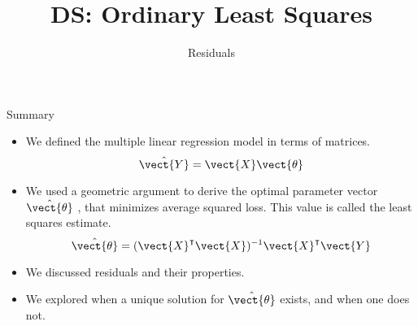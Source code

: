 \documentclass[aspectratio=169]{../latex_main/tntbeamer}  %
\title[Regression]{DS: Ordinary Least Squares}
\subtitle{Residuals}
\begin{document}
	
	\maketitle
	\begin{frame}{Summary}
	    \begin{itemize}
	        \item We defined the multiple linear regression model in terms of matrices.
	        \begin{equation*}
	            \hat{\vect{Y}} = \vect{X}\vect{\theta}
	        \end{equation*}
	        \item We used a geometric argument to derive the optimal parameter vector   $\hat{\vect{\theta}}$  , that minimizes average squared loss. This value is called the least squares estimate.
	        \begin{equation*}
	            \hat{\vect{\theta}} = (\vect{X}^\intercal\vect{X})^{-1} \vect{X}^\intercal\vect{Y}
	        \end{equation*}
	        \item We discussed residuals and their properties.
	        \item We explored when a unique solution for   $\hat{\vect{\theta}}$     exists, and when one does not.
	    \end{itemize}
	\end{frame}
	
\end{document}
